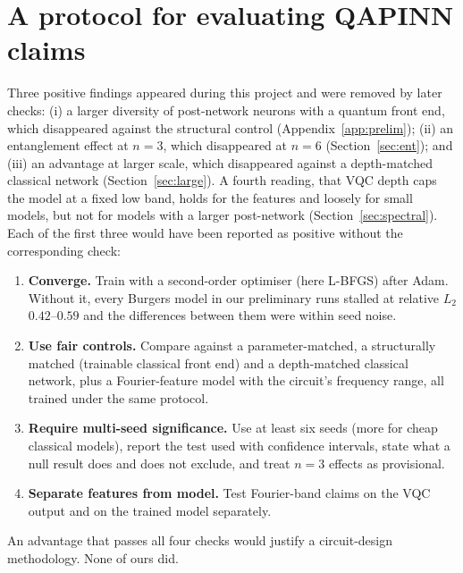 \documentclass[11pt]{article}
\newcommand{\relL}{relative $L_2$}
\begin{document}
\section{A protocol for evaluating QAPINN claims}\label{sec:protocol}
Three positive findings appeared during this project and were removed by later checks:
(i) a larger diversity of post-network neurons with a quantum front end, which
disappeared against the structural control (Appendix~\ref{app:prelim}); (ii) an
entanglement effect at $n=3$, which disappeared at $n=6$
(Section~\ref{sec:ent}); and (iii) an advantage at larger scale, which disappeared
against a depth-matched classical network (Section~\ref{sec:large}). A fourth reading,
that VQC depth caps the model at a fixed low band, holds for the features and loosely
for small models, but not for models with a larger post-network
(Section~\ref{sec:spectral}). Each of the first three would have been reported as
positive without the corresponding check:
\begin{enumerate}[nosep]
  \item \textbf{Converge.} Train with a second-order optimiser (here L-BFGS) after Adam.
  Without it, every Burgers model in our preliminary runs stalled at
  \relL{} $0.42$--$0.59$ and the differences between them were within seed noise.
  \item \textbf{Use fair controls.} Compare against a parameter-matched, a structurally
  matched (trainable classical front end) and a depth-matched classical network, plus a
  Fourier-feature model with the circuit's frequency range, all trained under the same
  protocol.
  \item \textbf{Require multi-seed significance.} Use at least six seeds (more for cheap
  classical models), report the test used with confidence intervals, state what a null
  result does and does not exclude, and treat $n=3$ effects as provisional.
  \item \textbf{Separate features from model.} Test Fourier-band claims on the VQC output
  and on the trained model separately.
\end{enumerate}
An advantage that passes all four checks would justify a circuit-design methodology.
None of ours did.

\end{document}
